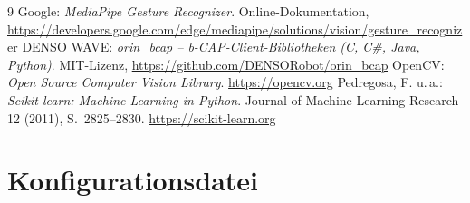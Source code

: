 \documentclass[11pt,a4paper]{article}
\begin{document}
\begin{thebibliography}{9}
 Google: \emph{MediaPipe Gesture Recognizer}. Online-Dokumentation,
  \url{https://developers.google.com/edge/mediapipe/solutions/vision/gesture_recognizer}
 DENSO WAVE: \emph{orin\_bcap – b-CAP-Client-Bibliotheken (C, C\#, Java, Python)}.
  MIT-Lizenz, \url{https://github.com/DENSORobot/orin_bcap}
 OpenCV: \emph{Open Source Computer Vision Library}. \url{https://opencv.org}
 Pedregosa, F. u.\,a.: \emph{Scikit-learn: Machine Learning in Python}. Journal of
  Machine Learning Research 12 (2011), S.~2825--2830. \url{https://scikit-learn.org}
\end{thebibliography}

\appendix
\section{Konfigurationsdatei}
\label{anh:config}

\end{document}
